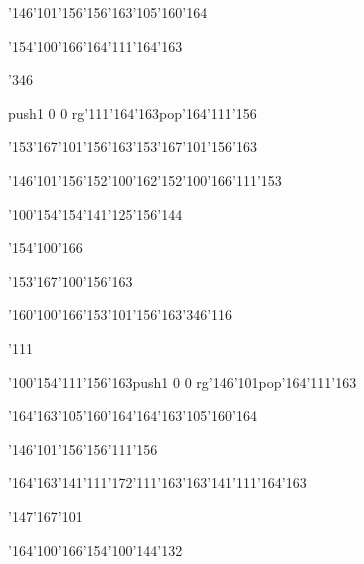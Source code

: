 \null\vfill\ipa\centerline{\enskip\enskip\enskip\enskip\char'146\char'101\char'156\enskip\char'156\char'163\char'105\char'160\char'164}\medskip\centerline{\enskip\enskip\enskip\char'154\char'100\char'166\enskip\char'164\char'111\char'164\char'163\enskip\enskip\enskip}\medskip\centerline{\enskip\char'346\enskip\enskip\enskip\enskip\enskip\enskip\enskip\enskip\enskip\enskip}\medskip\centerline{\enskip\enskip\enskip\enskip\pdfcolorstack\match push{1 0 0 rg}\char'111\char'164\char'163\pdfcolorstack\match pop{}\enskip\enskip\enskip\enskip\char'164\char'111\char'156}\medskip\centerline{\enskip\enskip\enskip\enskip\enskip\char'153\char'167\char'101\char'156\char'163\enskip\char'153\char'167\char'101\char'156\char'163\enskip\enskip\enskip}\medskip\centerline{\enskip\enskip\enskip\char'146\char'101\char'156\enskip\char'152\char'100\char'162\enskip\char'152\char'100\char'166\enskip\char'111\char'153}\medskip\centerline{\enskip\enskip\enskip\enskip\enskip\enskip\enskip\char'100\char'154\enskip\char'154\char'141\char'125\char'156\char'144\enskip\enskip\enskip}\medskip\centerline{\enskip\enskip\enskip\enskip\enskip\enskip\enskip\enskip\enskip\enskip\enskip\enskip}\medskip\centerline{\enskip\enskip\enskip\enskip\enskip\enskip\enskip\char'154\char'100\char'166\enskip\enskip\enskip\enskip\enskip}\medskip\vfill\footline{\hfil\tt\folio\hfil}\eject
\null\vfill\ipa\centerline{\enskip\enskip\enskip\enskip\enskip\enskip\enskip\enskip\char'153\char'167\char'100\char'156\char'163}\medskip\centerline{\enskip\enskip\enskip\char'160\char'100\char'166\enskip\char'153\char'101\char'156\char'163\enskip\char'346\char'116}\medskip\centerline{\enskip\char'111\enskip\enskip\enskip\enskip\enskip\enskip\enskip\enskip\enskip\enskip}\medskip\centerline{\enskip\char'100\char'154\enskip\char'111\char'156\char'163\enskip\pdfcolorstack\match push{1 0 0 rg}\char'146\char'101\pdfcolorstack\match pop{}\enskip\char'164\char'111\char'163}\medskip\centerline{\enskip\enskip\enskip\enskip\enskip\char'164\char'163\char'105\char'160\char'164\enskip\char'164\char'163\char'105\char'160\char'164\enskip\enskip\enskip}\medskip\centerline{\enskip\enskip\enskip\char'146\char'101\char'156\enskip\enskip\enskip\enskip\enskip\char'156\char'111\char'156\enskip\enskip\enskip}\medskip\centerline{\enskip\char'164\char'163\char'141\char'111\char'172\enskip\char'111\char'163\enskip\char'163\char'141\char'111\char'164\char'163\enskip\enskip\enskip}\medskip\centerline{\enskip\enskip\enskip\char'147\char'167\char'101\enskip\enskip\enskip\enskip\enskip\enskip}\medskip\centerline{\enskip\enskip\enskip\enskip\enskip\enskip\enskip\char'164\char'100\char'166\enskip\char'154\char'100\char'144\char'132}\medskip\vfill\footline{\hfil\tt\folio\hfil}\eject
